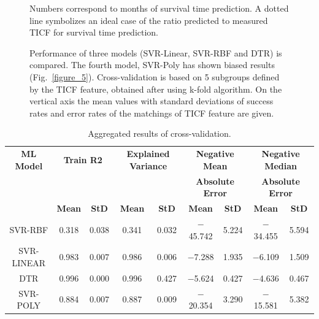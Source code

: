 \documentclass{bmcart}
\def\texttt{[image: ]}
\begin{document}
\begin{backmatter}
\begin{figure}[h!]
  \centering
  \texttt{[image: Fig6.eps]}
  \caption{
     Numbers correspond to months of survival time
prediction. A dotted line symbolizes an ideal case of the ratio
predicted to measured TICF for survival time prediction.
  }
  \label{figure_6}
\end{figure}



\begin{figure}[h!]
  \centering
  \texttt{[image: Fig7.eps]}
  \caption{
     Performance of three models (SVR-Linear,
SVR-RBF and DTR) is compared. The fourth model, SVR-Poly has shown
biased results (Fig.~\ref{figure_5}). Cross-validation is based on 5 subgroups
defined by the TICF feature, obtained after using k-fold algorithm. On
the vertical axis the mean values with standard deviations of success
rates and error rates of the matchings of TICF feature are given.
  }
  \label{figure_7}
\end{figure}


\begin{table}[h!]
\caption{Aggregated results of cross-validation.}
   \begin{tabular}{ccccccccc}
{\textbf{ML Model}} &  \multicolumn{2}{c}{{\textbf{Train R2}}} & \multicolumn{2}{c}{{\textbf{Explained Variance}}} & \multicolumn{2}{c}{\textbf{Negative Mean}} & \multicolumn{2}{c}{\textbf{Negative Median}}\\ & & & & & \multicolumn{2}{c}{\textbf{Absolute Error}} & \multicolumn{2}{c}{\textbf{Absolute Error}} \\
\midrule
{} & \textbf{Mean} & \textbf{StD} & \textbf{Mean} & \textbf{StD} & \textbf{Mean} & \textbf{StD} & \textbf{Mean} & \textbf{StD}\\
SVR-RBF & 0.318 & 0.038 & 0.341 & 0.032 & $-$45.742 & 5.224 & $-$34.455 & 5.594\\
SVR-LINEAR & 0.983 & 0.007 & 0.986 & 0.006 & $-$7.288 & 1.935 & $-$6.109 & 1.509\\
DTR & 0.996 & 0.000 & 0.996 & 0.427 & $-$5.624 & 0.427 & $-$4.636 & 0.467\\
SVR-POLY & 0.884 & 0.007 & 0.887 & 0.009 & $-$20.354 & 3.290 & $-$15.581 & 5.382\\
\bottomrule
\end{tabular}
\end{table}


\end{backmatter}
\end{document}
